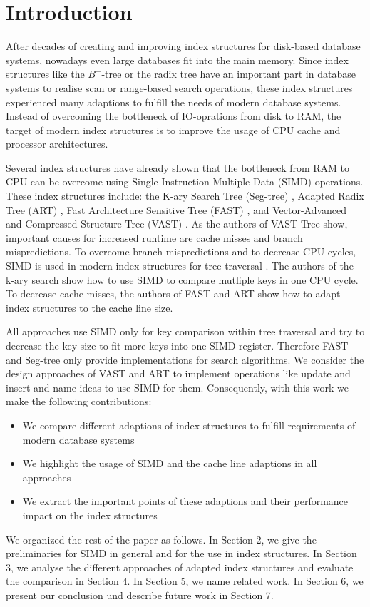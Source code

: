 \documentclass[conference]{IEEEtran}
\begin{document}
\section{Introduction}
After decades of creating and improving index structures for disk-based database systems, nowadays even large databases fit into the main memory. Since index structures like the $B^+$-tree or the radix tree have an important part in database systems to realise scan or range-based search operations, these index structures experienced many adaptions to fulfill the needs of modern database systems. Instead of overcoming the bottleneck of IO-oprations from disk to RAM, the target of modern index structures is to improve the usage of CPU cache and processor architectures.

Several index structures have already shown that the bottleneck from RAM to CPU can be overcome using Single Instruction Multiple Data (SIMD) \cite{b1} operations. These index structures include: the K-ary Search Tree (Seg-tree) \cite{b3}, Adapted Radix Tree (ART) \cite{b4}, Fast Architecture Sensitive Tree (FAST) \cite{b6}, and Vector-Advanced and Compressed Structure Tree (VAST) \cite{b5}. As the authors of VAST-Tree show, important causes for increased runtime are cache misses and branch mispredictions. To overcome branch mispredictions and to decrease CPU cycles, SIMD  is used in modern index structures for tree traversal \cite{b2}. The authors of the k-ary search show how to use SIMD to compare mutliple keys in one CPU cycle. To decrease cache misses, the authors of FAST and ART show how to adapt index structures to the cache line size.  

All approaches use SIMD only for key comparison within tree traversal and try to decrease the key size to fit more keys into one SIMD register. Therefore FAST and Seg-tree only provide implementations for search algorithms. We consider the design approaches of VAST and ART to implement operations like update and insert and name ideas to use SIMD for them. Consequently, with this work we make the following contributions:
\begin{itemize}
	\item We compare different adaptions of index structures to fulfill requirements of modern database systems
	\item We highlight the usage of SIMD and the cache line adaptions in all approaches
	\item We extract the important points of these adaptions and their performance impact on the index structures
\end{itemize}
We organized the rest of the paper as follows. In Section 2, we give the preliminaries for SIMD in general and for the use in index structures. In Section 3, we analyse the different approaches of adapted index structures and evaluate the comparison in Section 4. In Section 5, we name related work. In Section 6, we present our conclusion und describe future work in Section 7. 
\end{document}
